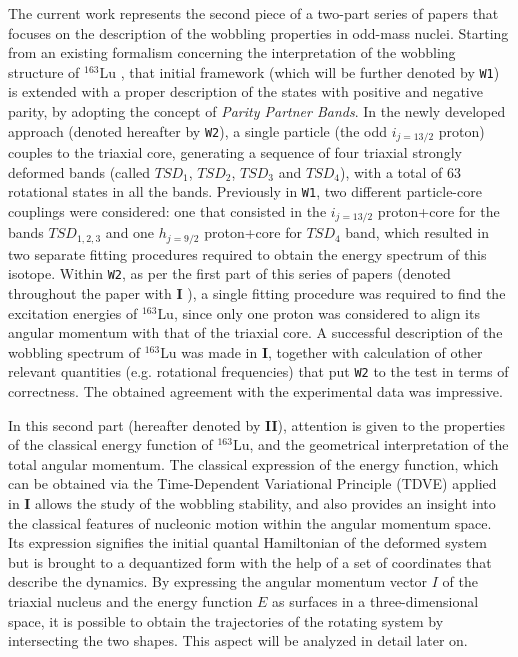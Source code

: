 \documentclass[myclassdoc,debug]{rjparticle}
\begin{document}
The current work represents the second piece of a two-part series of papers that focuses on the description of the wobbling properties in odd-mass nuclei. Starting from an existing formalism concerning the interpretation of the wobbling structure of $^{163}$Lu \cite{raduta2020approach,raduta2020towards}, that initial framework (which will be further denoted by \texttt{W1}) is extended with a proper description of the states with positive and negative parity, by adopting the concept of \emph{Parity Partner Bands}. In the newly developed approach (denoted hereafter by \texttt{W2}), a single particle (the odd $i_{j=13/2}$ proton) couples to the triaxial core, generating a sequence of four triaxial strongly deformed bands (called $TSD_1$, $TSD_2$, $TSD_3$ and $TSD_4$), with a total of 63 rotational states in all the bands. Previously in \texttt{W1}, two different particle-core couplings were considered: one that consisted in the $i_{j=13/2}$ proton+core for the bands $TSD_{1,2,3}$ and one $h_{j=9/2}$ proton+core for $TSD_4$ band, which resulted in two separate fitting procedures required to obtain the energy spectrum of this isotope. Within \texttt{W2}, as per the first part of this series of papers (denoted throughout the paper with \textbf{I} \cite{poenaru2021parity}), a single fitting procedure was required to find the excitation energies of $^{163}$Lu, since only one proton was considered to align its angular momentum with that of the triaxial core. A successful description of the wobbling spectrum of $^{163}$Lu was made in \textbf{I}, together with calculation of other relevant quantities (e.g. rotational frequencies) that put \texttt{W2} to the test in terms of correctness. The obtained agreement with the experimental data was impressive.

In this second part (hereafter denoted by \textbf{II}), attention is given to the properties of the classical energy function of $^{163}$Lu, and the geometrical interpretation of the total angular momentum. The classical expression of the energy function, which can be obtained via the Time-Dependent Variational Principle (TDVE) applied in \textbf{I} allows the study of the wobbling stability, and also provides an insight into the classical features of nucleonic motion within the angular momentum space. Its expression signifies the initial quantal Hamiltonian of the deformed system but is brought to a dequantized form with the help of a set of coordinates that describe the dynamics. By expressing the angular momentum vector $I$ of the triaxial nucleus and the energy function $E$ as surfaces in a three-dimensional space, it is possible to obtain the trajectories of the rotating system by intersecting the two shapes. This aspect will be analyzed in detail later on.
\end{document}
